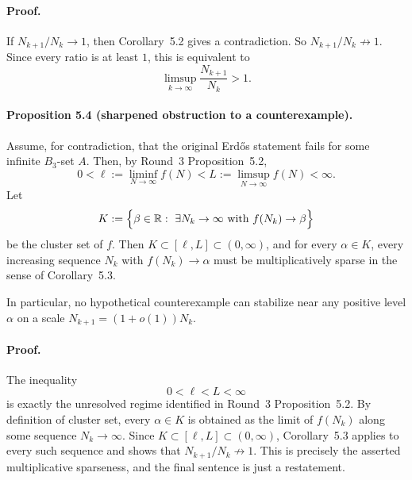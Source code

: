 \paragraph{Proof.}
If $N_{k+1}/N_k\to 1$, then Corollary~5.2 gives a contradiction. So $N_{k+1}/N_k\not\to 1$. Since every ratio is at least $1$, this is equivalent to
\[
\limsup_{k\to\infty}\frac{N_{k+1}}{N_k}>1.
\]

\paragraph{Proposition 5.4 (sharpened obstruction to a counterexample).}
Assume, for contradiction, that the original Erd\H{o}s statement fails for some infinite $B_3$-set $A$. Then, by Round~3 Proposition~5.2,
\[
0<\ell:=\liminf_{N\to\infty}f(N)
<
L:=\limsup_{N\to\infty}f(N)
<\infty.
\]
Let
\[
K:=\Bigl\{\beta\in\mathbb{R}:\ \exists N_k\to\infty\text{ with }f(N_k)\to\beta\Bigr\}
\]
be the cluster set of $f$. Then $K\subset[\ell,L]\subset(0,\infty)$, and for every $\alpha\in K$, every increasing sequence $N_k$ with $f(N_k)\to\alpha$ must be multiplicatively sparse in the sense of Corollary~5.3.

In particular, no hypothetical counterexample can stabilize near any positive level $\alpha$ on a scale $N_{k+1}=(1+o(1))N_k$.

\paragraph{Proof.}
The inequality
\[
0<\ell<L<\infty
\]
is exactly the unresolved regime identified in Round~3 Proposition~5.2. By definition of cluster set, every $\alpha\in K$ is obtained as the limit of $f(N_k)$ along some sequence $N_k\to\infty$. Since $K\subset[\ell,L]\subset(0,\infty)$, Corollary~5.3 applies to every such sequence and shows that $N_{k+1}/N_k\not\to1$. This is precisely the asserted multiplicative sparseness, and the final sentence is just a restatement.

